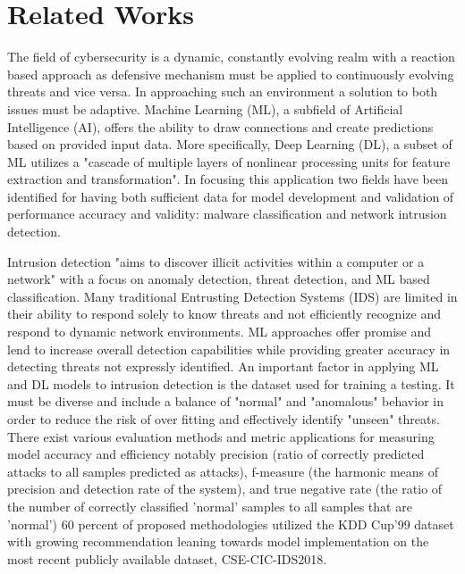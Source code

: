 \section{Related Works}
The field of cybersecurity is a dynamic, constantly evolving realm with a reaction based 
approach as defensive mechanism must be applied to continuously evolving threats and vice versa. 
In approaching such an environment a solution to both issues must be adaptive. Machine 
Learning (ML), a subfield of Artificial Intelligence (AI), offers the ability to draw connections and create predictions based on provided input data. More specifically, Deep Learning (DL), a subset of ML utilizes a "cascade of multiple layers of nonlinear processing units for feature extraction and transformation". %
In focusing this application two fields have been identified for having both sufficient data for 
model development and validation of performance accuracy and validity: malware classification 
and network intrusion detection. 

Intrusion detection "aims to discover illicit activities 
within a computer or a network" with a focus on anomaly detection, threat detection, and ML 
based classification. %
Many traditional Entrusting Detection Systems (IDS) are limited in their ability to respond solely to know threats and not efficiently recognize and respond to dynamic network environments. ML approaches offer promise and lend to increase overall detection capabilities while providing greater accuracy in detecting threats not expressly identified. An important factor in applying ML and DL models to intrusion detection is the dataset used for training a testing. It must be diverse and include a balance of "normal" and "anomalous" behavior in order to reduce the risk of over fitting and effectively identify "unseen" threats. %
There exist various evaluation methods and metric applications for measuring model accuracy and efficiency notably precision (ratio of correctly predicted attacks to all samples predicted as attacks), f-measure (the harmonic means of precision and detection rate of the system), and true negative rate (the ratio of the number of correctly classified 'normal' samples to all samples that are 'normal') %
60 percent of proposed methodologies utilized the KDD Cup'99 dataset with growing recommendation leaning towards model implementation on the most recent publicly available dataset, CSE-CIC-IDS2018.

